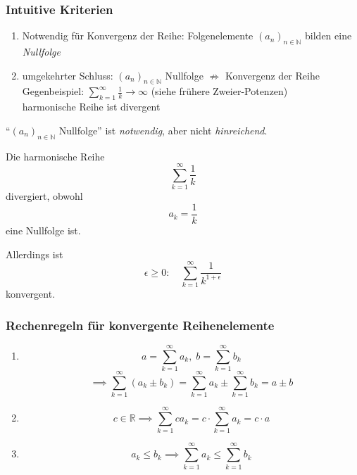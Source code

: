 \subsubsection*{Intuitive Kriterien}

\begin{enumerate}
    \item Notwendig für Konvergenz der Reihe: Folgenelemente $(a_n)_{n \in \mathbb{N}}$ bilden eine \emph{Nullfolge}
    \item umgekehrter Schluss: $(a_n)_{n \in \mathbb{N}}$ Nullfolge $\not\Rightarrow$ Konvergenz der Reihe\\
        Gegenbeispiel: $\sum_{k=1}^{\infty} \frac{1}{k} \rightarrow \infty $ (siehe frühere Zweier-Potenzen) \\
        harmonische Reihe ist divergent
\end{enumerate}

\begin{note}
    "`$(a_n)_{n \in \mathbb{N}}$ Nullfolge"' ist \emph{notwendig}, aber nicht \emph{hinreichend}.
\end{note}

\begin{example} Die harmonische Reihe
  \[ \sum_{k=1}^{\infty} \frac{1}{k} \]
  divergiert, obwohl
  \[ a_k = \frac{1}{k} \] eine Nullfolge ist.
\end{example}

\begin{note} Allerdings ist
    \[ \epsilon \ge 0: \quad \sum_{k=1}^{\infty} \frac{1}{k^{1+\epsilon}} \]
    konvergent.
\end{note}

\subsubsection*{Rechenregeln für konvergente Reihenelemente}
\begin{enumerate}
    \item \begin{equation*} a = \sum_{k=1}^{\infty} a_k,\; b = \sum_{k=1}^{\infty} b_k \end{equation*}
        \begin{equation*}\implies \sum_{k = 1}^{\infty} \left( a_k \pm b_k \right) = \sum_{k=1}^{\infty} a_k \pm \sum_{k=1}^{\infty} b_k = a \pm b
        \end{equation*}
    \item \begin{equation*}c \in \mathbb{R} \implies \sum_{k=1}^{\infty} c a_k = c \cdot\sum_{k=1}^{\infty} a_k = c \cdot a \end{equation*}
    \item \begin{equation*}a_k \leq b_k \implies \sum_{k=1}^{\infty} a_k \leq \sum_{k=1}^{\infty} b_k \end{equation*}
\end{enumerate}


